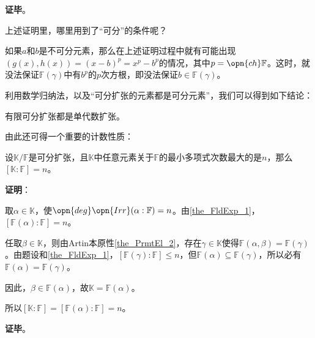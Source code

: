 \textbf{证毕}。

上述证明里，哪里用到了“可分”的条件呢？

如果$a$和$b$是不可分元素，那么在上述证明过程中就有可能出现$(g(x), h(x))=(x-b)^p=x^p-b^p$的情况，其中$p=\opn{ch}\mathbb{F}$。这时，就没法保证$\mathbb{F}(\gamma)$中有$b^p$的$p$次方根，即没法保证$b\in\mathbb{F}(\gamma)$。

利用数学归纳法，以及“可分扩张的元素都是可分元素”，我们可以得到如下结论：

\begin{corollary}{}\label{cor_PrmtEl_2}
有限可分扩张都是单代数扩张。
\end{corollary}



由此还可得一个重要的计数性质：

\begin{corollary}{}\label{cor_PrmtEl_3}
设$\mathbb{K}/\mathbb{F}$是可分扩张，且$\mathbb{K}$中任意元素关于$\mathbb{F}$的最小多项式次数最大的是$n$，那么$[\mathbb{K}:\mathbb{F}] = n$。
\end{corollary}

\textbf{证明}：

取$\alpha\in\mathbb{K}$，使$\opn{deg}\opn{Irr}(\alpha:\mathbb{F})=n$。由\autoref{the_FldExp_1}，$[\mathbb{F}(\alpha):\mathbb{F}]=n$。

任取$\beta\in\mathbb{K}$，则由Artin本原性\autoref{the_PrmtEl_2}，存在$\gamma\in\mathbb{K}$使得$\mathbb{F}(\alpha, \beta)=\mathbb{F}(\gamma)$。由题设和\autoref{the_FldExp_1}，$[\mathbb{F}(\gamma):\mathbb{F}]\leq n$，但$\mathbb{F}(\alpha)\subseteq\mathbb{F}(\gamma)$，所以必有$\mathbb{F}(\alpha)=\mathbb{F}(\gamma)$。

因此，$\beta\in\mathbb{F}(\alpha)$，故$\mathbb{K}=\mathbb{F}(\alpha)$。

所以$[\mathbb{K}:\mathbb{F}]=[\mathbb{F}(\alpha):\mathbb{F}]=n$。

\textbf{证毕}。

















